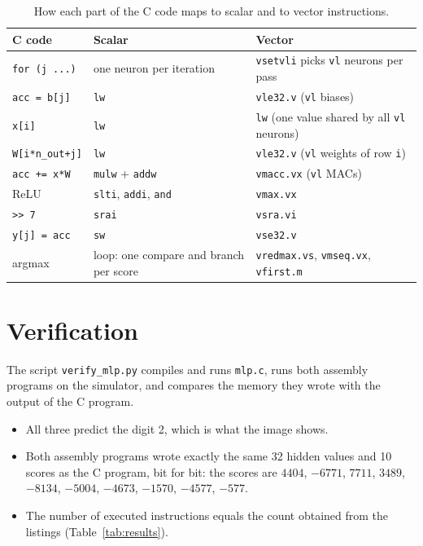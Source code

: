 \documentclass[11pt,a4paper]{article}
\newcommand{\code}[1]{\texttt{#1}}
\begin{document}
\begin{table}[H]
\centering\small
\caption{How each part of the C code maps to scalar and to vector instructions.}
\label{tab:map}
\begin{tabular}{>{\raggedright\arraybackslash}p{3.5cm}>{\raggedright\arraybackslash}p{5.2cm}>{\raggedright\arraybackslash}p{5.9cm}}
\toprule
C code & Scalar & Vector \\
\midrule
\code{for (j ...)} & one neuron per iteration & \code{vsetvli} picks \code{vl} neurons per pass \\
\code{acc = b[j]}  & \code{lw} & \code{vle32.v} (\code{vl} biases) \\
\code{x[i]}        & \code{lw} & \code{lw} (one value shared by all \code{vl} neurons) \\
\code{W[i*n\_out+j]} & \code{lw} & \code{vle32.v} (\code{vl} weights of row \code{i}) \\
\code{acc += x*W}  & \code{mulw} + \code{addw} & \code{vmacc.vx} (\code{vl} MACs) \\
ReLU               & \code{slti}, \code{addi}, \code{and} & \code{vmax.vx} \\
\code{>> 7}        & \code{srai} & \code{vsra.vi} \\
\code{y[j] = acc}  & \code{sw} & \code{vse32.v} \\
argmax             & loop: one compare and branch per score
                   & \code{vredmax.vs}, \code{vmseq.vx}, \code{vfirst.m} \\
\bottomrule
\end{tabular}
\end{table}

\section{Verification}

The script \code{verify\_mlp.py} compiles and runs \code{mlp.c}, runs both assembly programs on
the simulator, and compares the memory they wrote with the output of the C program.

\begin{itemize}
  \item All three predict the digit 2, which is what the image shows.
  \item Both assembly programs wrote exactly the same 32 hidden values and 10 scores as the C
        program, bit for bit: the scores are $4404$, $-6771$, $7711$, $3489$, $-8134$, $-5004$, $-4673$, $-1570$, $-4577$, $-577$.
  \item The number of executed instructions equals the count obtained from the listings
        (Table~\ref{tab:results}).
\end{itemize}
\end{document}
